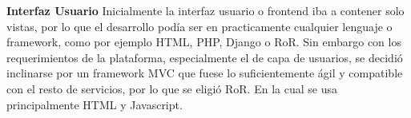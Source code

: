 \textbf{Interfaz Usuario}
Inicialmente la interfaz usuario o frontend iba a contener solo vistas, por lo que el desarrollo podía ser en practicamente cualquier lenguaje o framework, como por ejemplo HTML, PHP, Django o RoR. Sin embargo con los requerimientos de la plataforma, especialmente el de capa de usuarios, se decidió inclinarse por un framework MVC que fuese lo suficientemente ágil y compatible con el resto de servicios, por lo que se eligió RoR. En la cual se usa principalmente HTML y Javascript.